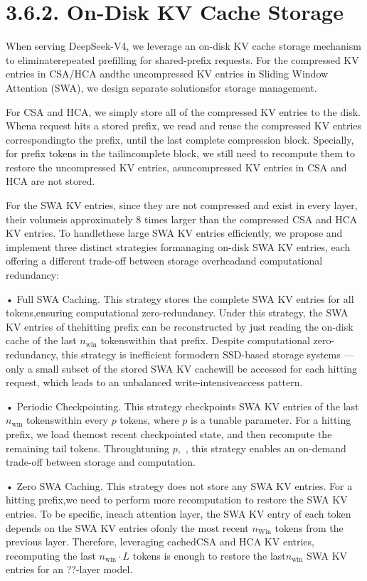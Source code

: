 \documentclass[
  10
]{article}
\begin{document}
\section{3.6.2. On-Disk KV Cache
Storage}\label{on-disk-kv-cache-storage}

When serving DeepSeek-V4, we leverage an on-disk KV cache storage
mechanism to eliminaterepeated prefilling for shared-prefix requests.
For the compressed KV entries in CSA/HCA andthe uncompressed KV entries
in Sliding Window Attention (SWA), we design separate solutionsfor
storage management.

For CSA and HCA, we simply store all of the compressed KV entries to the
disk. Whena request hits a stored prefix, we read and reuse the
compressed KV entries correspondingto the prefix, until the last
complete compression block. Specially, for prefix tokens in the
tailincomplete block, we still need to recompute them to restore the
uncompressed KV entries, asuncompressed KV entries in CSA and HCA are
not stored.

For the SWA KV entries, since they are not compressed and exist in every
layer, their volumeis approximately 8 times larger than the compressed
CSA and HCA KV entries. To handlethese large SWA KV entries efficiently,
we propose and implement three distinct strategies formanaging on-disk
SWA KV entries, each offering a different trade-off between storage
overheadand computational redundancy:

• Full SWA Caching. This strategy stores the complete SWA KV entries for
all tokens,ensuring computational zero-redundancy. Under this strategy,
the SWA KV entries of thehitting prefix can be reconstructed by just
reading the on-disk cache of the last \(n _ { \mathrm { w i n } }\)
tokenswithin that prefix. Despite computational zero-redundancy, this
strategy is inefficient formodern SSD-based storage systems --- only a
small subset of the stored SWA KV cachewill be accessed for each hitting
request, which leads to an unbalanced write-intensiveaccess pattern.

• Periodic Checkpointing. This strategy checkpoints SWA KV entries of
the last \(n _ { \mathrm { w i n } }\) tokenswithin every \(p\) tokens,
where \(p\) is a tunable parameter. For a hitting prefix, we load
themost recent checkpointed state, and then recompute the remaining tail
tokens. Throughtuning \(p ,\) , this strategy enables an on-demand
trade-off between storage and computation.

• Zero SWA Caching. This strategy does not store any SWA KV entries. For
a hitting prefix,we need to perform more recomputation to restore the
SWA KV entries. To be specific, ineach attention layer, the SWA KV entry
of each token depends on the SWA KV entries ofonly the most recent
\(n _ { \mathrm { W i n } }\) tokens from the previous layer. Therefore,
leveraging cachedCSA and HCA KV entries, recomputing the last
\(n _ { \mathrm { w i n } } \cdot L\) tokens is enough to restore the
last\(n _ { \mathrm { w i n } }\) SWA KV entries for an ??-layer model.
\end{document}
